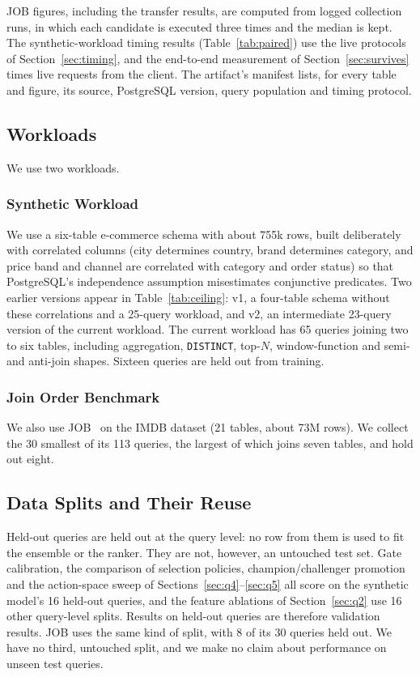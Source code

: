 \documentclass[conference]{IEEEtran}
\begin{document}
JOB figures, including the transfer results, are computed from logged
collection runs, in which each candidate is executed three times and the median
is kept. The synthetic-workload timing results (Table~\ref{tab:paired}) use
the live protocols of Section~\ref{sec:timing}, and the end-to-end measurement
of Section~\ref{sec:survives} times live requests from the client. The
artifact's manifest lists, for every table and figure, its source, PostgreSQL
version, query population and timing protocol.

\subsection{Workloads}

We use two workloads.

\subsubsection{Synthetic Workload}
We use a six-table e-commerce schema with about 755k rows, built
deliberately with correlated columns (city determines country, brand determines
category, and price band and channel are correlated with category and order
status) so that PostgreSQL's independence assumption misestimates conjunctive
predicates. Two earlier versions appear in Table~\ref{tab:ceiling}: v1, a
four-table schema without these correlations and a 25-query workload, and v2, an
intermediate 23-query version of the current workload. The current workload has
65 queries joining two to six tables, including aggregation, \texttt{DISTINCT},
top-$N$, window-function and semi- and anti-join shapes. Sixteen queries are
held out from training.

\subsubsection{Join Order Benchmark}
We also use JOB~\cite{leis,jobrepo} on the IMDB dataset
(21 tables, about 73M rows). We collect the 30 smallest of its 113 queries, the
largest of which joins seven tables, and hold out eight.

\subsection{Data Splits and Their Reuse}
\label{sec:splits}

Held-out queries are held out at the query level: no row from them is used to
fit the ensemble or the ranker. They are not, however, an untouched test set.
Gate calibration, the comparison of selection policies, champion/challenger
promotion and the action-space sweep of Sections~\ref{sec:q4}--\ref{sec:q5} all score
on the synthetic model's 16 held-out queries, and the feature ablations of
Section~\ref{sec:q2} use 16 other query-level splits. Results on held-out
queries are therefore validation results. JOB uses the same kind of split, with
8 of its 30 queries held out. We have no third, untouched split, and we make no
claim about performance on unseen test queries.
\end{document}
